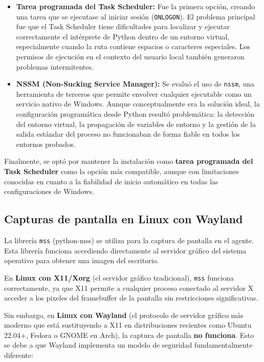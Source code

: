 \documentclass[12pt, a4paper, twoside]{article}
\begin{document}
\begin{itemize}
  \item \textbf{Tarea programada del Task Scheduler:} Fue la primera opción, creando una tarea que se ejecutase al iniciar sesión (\texttt{ONLOGON}). El problema principal fue que el Task Scheduler tiene dificultades para localizar y ejecutar correctamente el intérprete de Python dentro de un entorno virtual, especialmente cuando la ruta contiene espacios o caracteres especiales. Los permisos de ejecución en el contexto del usuario local también generaron problemas intermitentes.
  \item \textbf{NSSM (Non-Sucking Service Manager):} Se evaluó el uso de \texttt{nssm}, una herramienta de terceros que permite envolver cualquier ejecutable como un servicio nativo de Windows. Aunque conceptualmente era la solución ideal, la configuración programática desde Python resultó problemática: la detección del entorno virtual, la propagación de variables de entorno y la gestión de la salida estándar del proceso no funcionaban de forma fiable en todos los entornos probados.
\end{itemize}

Finalmente, se optó por mantener la instalación como \textbf{tarea programada del Task Scheduler} como la opción más compatible, aunque con limitaciones conocidas en cuanto a la fiabilidad de inicio automático en todas las configuraciones de Windows.

\subsection{Capturas de pantalla en Linux con Wayland}

La librería \texttt{mss} (python-mss) se utiliza para la captura de pantalla en el agente. Esta librería funciona accediendo directamente al servidor gráfico del sistema operativo para obtener una imagen del escritorio.

En \textbf{Linux con X11/Xorg} (el servidor gráfico tradicional), \texttt{mss} funciona correctamente, ya que X11 permite a cualquier proceso conectado al servidor X acceder a los pixeles del framebuffer de la pantalla sin restricciones significativas.

Sin embargo, en \textbf{Linux con Wayland} (el protocolo de servidor gráfico más moderno que está sustituyendo a X11 en distribuciones recientes como Ubuntu 22.04+, Fedora o GNOME en Arch), la captura de pantalla \textbf{no funciona}. Esto se debe a que Wayland implementa un modelo de seguridad fundamentalmente diferente:
\end{document}

